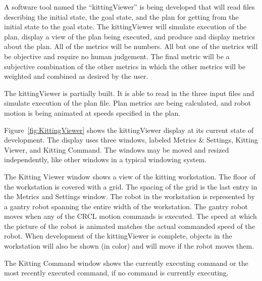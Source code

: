 A software tool named the ``kittingViewer'' is being developed that will
read files describing the initial state, the goal state, and the plan for
getting from the initial state to the goal state. The kittingViewer will
simulate execution of the plan, display a view of the plan being executed,
and produce and display metrics about the plan.  All of the metrics will be
numbers. All but one of the metrics will be objective and require no human
judgement. The final metric will be a subjective combination of the other
metrics in which the other metrics will be weighted and combined as desired
by the user.

The kittingViewer is partially built. It is able to read in the three
input files and simulate execution of the plan file. Plan metrics are
being calculated, and robot motion is being animated at speeds specified
in the plan.

Figure~\ref{fig:KittingViewer} shows the kittingViewer display at its
current state of development. The display uses three windows, labeled
Metrics \& Settings, Kitting Viewer, and Kitting Command. The windows may
be moved and resized independently, like other windows in a typical
windowing system. 

The Kitting Viewer window shows a view of the kitting workstation. The
floor of the workstation is covered with a grid. The spacing of the grid is
the last entry in the Metrics and Settings window. The robot in the
workstation is represented by a gantry robot spanning the entire width of
the workstation.  The gantry robot moves when any of the CRCL motion
commands is executed.  The speed at which the picture of the robot is
animated matches the actual commanded speed of the robot.  When development
of the kittingViewer is complete, objects in the workstation will also be
shown (in color) and will move if the robot moves them.

The Kitting Command window shows the currently executing command or the
most recently executed command, if no command is currently executing.

